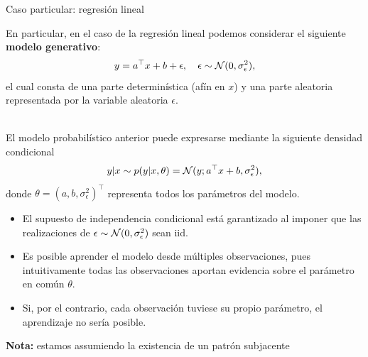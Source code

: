 \documentclass[handout, 9pt]{beamer}
\begin{document}
\begin{frame}{Caso particular: regresión lineal}
	
En particular, en el caso de la regresión lineal podemos considerar el siguiente \textbf{modelo  generativo}:
\begin{equation*}
	y = a^\top x + b + \epsilon,\quad \epsilon\sim{\mathcal N}(0,\sigma_\epsilon^2),
\end{equation*}
el cual consta de una parte determinística (afín en $x$) y una parte aleatoria representada por la variable aleatoria $\epsilon$.\\~\ \pause

El modelo probabilístico anterior puede expresarse mediante la siguiente densidad condicional 
\begin{equation*}
	y|x \sim p(y|x,\theta) = {\mathcal N}(y;a^\top x + b ,\sigma_\epsilon^2),\label{eq:mod_lin_gau}
\end{equation*}
donde $\theta=(a,b,\sigma_\epsilon^2)^\top$ representa todos los parámetros del modelo. \pause

\begin{itemize}
	\item El supuesto de independencia condicional está garantizado al imponer que las realizaciones de $\epsilon\sim{\mathcal N}(0,\sigma_\epsilon^2)$ sean iid.\pause
	\item Es posible aprender el modelo desde múltiples observaciones, pues intuitivamente todas las observaciones aportan evidencia sobre el parámetro en común $\theta$. 
	\item  Si, por el contrario, cada observación tuviese su propio parámetro, el aprendizaje no sería posible.
\end{itemize}
 \textbf{Nota:} estamos assumiendo la existencia de un patrón subjacente\pause
	
\end{frame}
\end{document}
